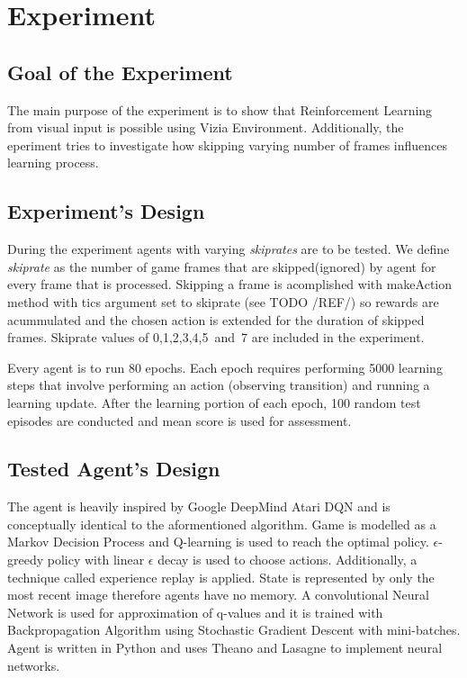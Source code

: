 \chapter{Experiment}

\section{Goal of the Experiment}
The main purpose of the experiment is to show that Reinforcement Learning from visual input is possible using Vizia Environment. 	
Additionally, the eperiment tries to investigate how skipping varying number of frames influences learning process.

\section{Experiment's Design}
During the experiment agents with varying \emph{skiprates} are to be tested. We define \emph{skiprate} as the number of game frames that are skipped(ignored) by agent for every frame that is processed. Skipping a frame is acomplished with makeAction method with tics argument set to skiprate (see TODO /REF/) so rewards are acummulated and the chosen action is extended for the duration of skipped frames. Skiprate values of 0,1,2,3,4,5~and~7 are included in the experiment. 

Every agent is to run 80 epochs. Each epoch requires performing 5000 learning steps that involve performing an action (observing transition) and running a learning update. After the learning portion of each epoch, 100 random test episodes are conducted and mean score is used for assessment.  

\section{Tested Agent's Design}
	The agent is heavily inspired by Google DeepMind Atari DQN \cite{mnih-dqn-2015}\cite{mnih-atari-2013} and is conceptually identical to the aformentioned algorithm. Game is modelled as a Markov Decision Process and Q-learning\cite{watkins:mlj92} is used to reach the optimal policy. $\epsilon$-greedy policy with linear $\epsilon$ decay is used to choose actions. Additionally, a technique called experience replay\cite{mnih-dqn-2015} is applied. State is represented by only the most recent image therefore agents have no memory. A convolutional Neural Network is used for approximation of q-values and it is trained with Backpropagation Algorithm\cite{lecun-98b} using Stochastic Gradient Descent with mini-batches. Agent is written in Python and uses Theano\cite{Bastien-Theano-2012}\cite{bergstra+al:2010-scipy} and Lasagne\cite{sander_dieleman_2015_27878} to implement neural networks. 

